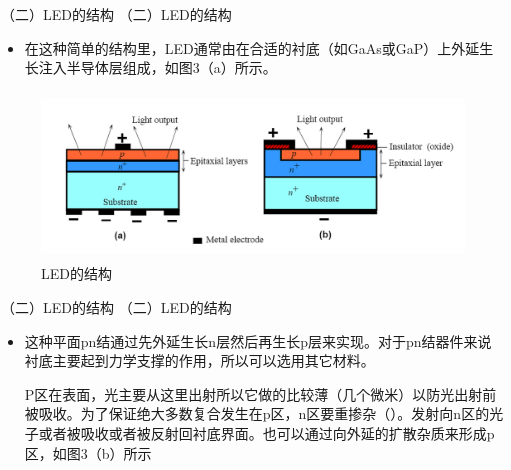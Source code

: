 \documentclass[trans]{beamer} %
\begin{document}
 \begin{frame}{（二）LED的结构}
（二）LED的结构
    \begin{itemize}
        \item  在这种简单的结构里，LED通常由在合适的衬底（如GaAs或GaP）上外延生长注入半导体层组成，如图3（a）所示。
    \end{itemize}
    \begin{figure}[htbp] 
    \centering\includegraphics[height=1.75in]{source/ch2/fg225.png} 
    \caption{LED的结构}
    \end{figure}
 \end{frame}
 


 \begin{frame}{（二）LED的结构}
（二）LED的结构
    \begin{itemize}
        \item  这种平面pn结通过先外延生长n层然后再生长p层来实现。对于pn结器件来说衬底主要起到力学支撑的作用，所以可以选用其它材料。
        
        P区在表面，光主要从这里出射所以它做的比较薄（几个微米）以防光出射前被吸收。为了保证绝大多数复合发生在p区，n区要重掺杂（）。发射向n区的光子或者被吸收或者被反射回衬底界面。也可以通过向外延的扩散杂质来形成p区，如图3（b）所示 

    \end{itemize}

 \end{frame}
 
\end{document}
